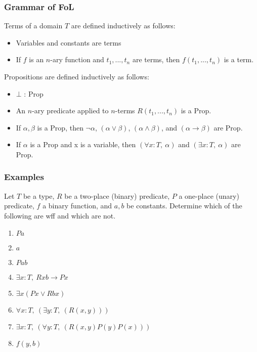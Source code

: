 \documentclass{beamer}
\theoremstyle{indentDefn} \newtheorem{defn}[]{Definition}
\begin{document}
\begin{frame}
	\frametitle{Grammar of FoL}
	
	Terms of a domain $T$ are defined inductively as follows: 
	
	\begin{itemize}
		\item Variables and constants are terms
		\item If $f$ is an $n$-ary function and $t_{1}, ... , t_{n}$ are terms, then $f(t_{1}, ... , t_{n})$ is a term.
	\end{itemize}


	\vspace{2mm}

	Propositions are defined inductively as follows: 
	
	\begin{itemize}
		\item $\bot$ : Prop
		\item An $n$-ary predicate applied to $n$-terms $R(t_{1}, ... , t_{n})$ is a Prop.
		\item If $\alpha, \beta$ is a Prop, then $\lnot \alpha$, $(\alpha \lor \beta)$, $(\alpha \land \beta)$, and $(\alpha \rightarrow \beta)$ are Prop.
		\item If $\alpha$ is a Prop and x is a variable, then $(\forall x : T, \ \alpha)$ and $(\exists x :T, \ \alpha)$ are Prop. 
	\end{itemize}
\end{frame}

\begin{frame}
	\frametitle{Examples}
	
	Let $T$ be a type, $R$ be a two-place (binary) predicate, $P$ a one-place (unary) predicate, $f$ a binary function, and $a,b$ be constants.	Determine which of the following are wff and which are not. 
	
	\begin{enumerate}
		\item $Pa$
		\item $a$
		\item $Pab$
		\item $\exists x : T, \ Rxb \rightarrow Px$
		\item $\exists x (Px \lor Rbx)$
		\item $\forall x : T, \ (\exists y : T, \ (R(x,y)))$
		\item $\exists x : T, \ (\forall y : T, \ (R(x,y)P(y)P(x)))$
		\item $f(y,b)$
	\end{enumerate}
\end{frame}
\end{document}
